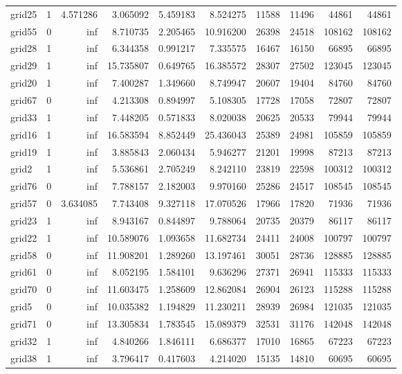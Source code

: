 \begin{longtable}{|l|r|r|r|r|r|r|r|r|r|}
grid25 & 1 & 4.571286 & 3.065092 & 5.459183 & 8.524275 & 11588 & 11496 & 44861 & 44861 \\
grid55 & 0 & inf & 8.710735 & 2.205465 & 10.916200 & 26398 & 24518 & 108162 & 108162 \\
grid28 & 1 & inf & 6.344358 & 0.991217 & 7.335575 & 16467 & 16150 & 66895 & 66895 \\
grid29 & 1 & inf & 15.735807 & 0.649765 & 16.385572 & 28307 & 27502 & 123045 & 123045 \\
grid20 & 1 & inf & 7.400287 & 1.349660 & 8.749947 & 20607 & 19404 & 84760 & 84760 \\
grid67 & 0 & inf & 4.213308 & 0.894997 & 5.108305 & 17728 & 17058 & 72807 & 72807 \\
grid33 & 1 & inf & 7.448205 & 0.571833 & 8.020038 & 20625 & 20533 & 79944 & 79944 \\
grid16 & 1 & inf & 16.583594 & 8.852449 & 25.436043 & 25389 & 24981 & 105859 & 105859 \\
grid19 & 1 & inf & 3.885843 & 2.060434 & 5.946277 & 21201 & 19998 & 87213 & 87213 \\
grid2 & 1 & inf & 5.536861 & 2.705249 & 8.242110 & 23819 & 22598 & 100312 & 100312 \\
grid76 & 0 & inf & 7.788157 & 2.182003 & 9.970160 & 25286 & 24517 & 108545 & 108545 \\
grid57 & 0 & 3.634085 & 7.743408 & 9.327118 & 17.070526 & 17966 & 17820 & 71936 & 71936 \\
grid23 & 1 & inf & 8.943167 & 0.844897 & 9.788064 & 20735 & 20379 & 86117 & 86117 \\
grid22 & 1 & inf & 10.589076 & 1.093658 & 11.682734 & 24411 & 24008 & 100797 & 100797 \\
grid58 & 0 & inf & 11.908201 & 1.289260 & 13.197461 & 30051 & 28736 & 128885 & 128885 \\
grid61 & 0 & inf & 8.052195 & 1.584101 & 9.636296 & 27371 & 26941 & 115333 & 115333 \\
grid70 & 0 & inf & 11.603475 & 1.258609 & 12.862084 & 26904 & 26123 & 115288 & 115288 \\
grid5 & 0 & inf & 10.035382 & 1.194829 & 11.230211 & 28939 & 26984 & 121035 & 121035 \\
grid71 & 0 & inf & 13.305834 & 1.783545 & 15.089379 & 32531 & 31176 & 142048 & 142048 \\
grid32 & 1 & inf & 4.840266 & 1.846111 & 6.686377 & 17010 & 16865 & 67223 & 67223 \\
grid38 & 1 & inf & 3.796417 & 0.417603 & 4.214020 & 15135 & 14810 & 60695 & 60695 \\

\end{longtable}
